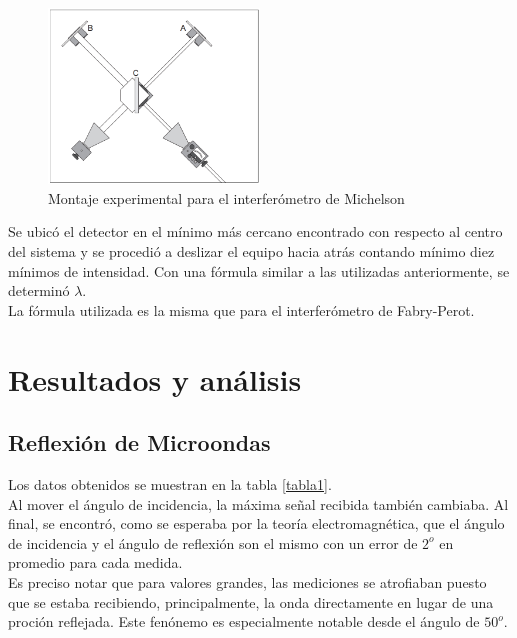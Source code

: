 \documentclass[prb,aps,twocolumn,preprintnumbers,amsmath,amssymb]{revtex4}
\begin{document}
\begin{figure}[h!]
\centering
\includegraphics[width=0.5\textwidth]{michelson}
\caption{Montaje experimental para el interferómetro de Michelson}
\label{fig:intmichelson}
\end{figure}

Se ubicó el detector en el mínimo más cercano encontrado con respecto al centro del sistema y se procedió a deslizar el equipo hacia atrás contando mínimo diez mínimos de intensidad. Con una fórmula similar a las utilizadas anteriormente, se determinó $ \lambda $. \\

La fórmula utilizada es la misma que para el interferómetro de Fabry-Perot. 


\section{Resultados y análisis}

\subsection{Reflexión de Microondas}

Los datos obtenidos se muestran en la tabla \ref{tabla1}.\\

Al mover el ángulo de incidencia, la máxima señal recibida también cambiaba. Al final, se encontró, como se esperaba por la teoría electromagnética, que el ángulo de incidencia y el ángulo de reflexión son el mismo con un error de $2^o$ en promedio para cada medida. \\

Es preciso notar que para valores grandes, las mediciones se atrofiaban puesto que se estaba recibiendo, principalmente, la onda directamente en lugar de una proción reflejada. Este fenónemo es especialmente notable desde el ángulo de $50^o$.
\end{document}
